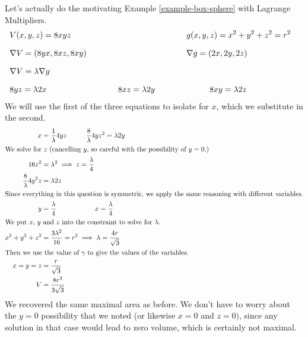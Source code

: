 \documentclass[fleqn,letterpaper]{report}
\begin{document}
\begin{example}
Let's actually do the motivating Example \ref{example-box-sphere} with
Lagrange Multipliers. 
\begin{displaymath}
\begin{array}{*4{>{\displaystyle}l}}
V(x,y,z) = 8xyz & & 
\hspace{1cm} g(x,y,z) = x^2 + y^2 + z^2 = r^2 & \\[1em]
\nabla V = (8yx,8xz,8xy) & & 
\hspace{1cm} \nabla g = (2x, 2y, 2z) & \\[1em]
\nabla V = \lambda \nabla g & & & \\[1em]
8yz = \lambda 2x & 
\hspace{1cm} 8xz = \lambda 2y & 
\hspace{2cm} 8xy = \lambda 2z & 
\end{array}
\end{displaymath}
We will use the first of the three equations to isolate for
$x$, which we substitute in the second. 
\begin{align*}
x & = \frac{1}{\lambda} 4yz 
\hspace{1cm} \frac{8}{\lambda} 4yz^2 = \lambda 2y \\
\intertext{We solve for $z$ (cancelling $y$, so careful with
the possibility of $y=0$.)}
16z^2 & = \lambda^2 \implies z = \frac{\lambda}{4} \\
\frac{8}{\lambda} 4 y^2 z & = \lambda 2z \\
\intertext{Since everything in this question is symmetric, we
apply the same reasoning with different variables.}
y & = \frac{\lambda}{4} \hspace{2cm} 
x = \frac{\lambda}{4} \\
\intertext{We put $x$, $y$ and $z$ into the constraint to
solve for $\lambda$.}
x^2 + y^2 + z^2 & = \frac{3\lambda^2}{16} = r^2 \implies 
\lambda = \frac{4r}{\sqrt{3}} \\
\intertext{Then we use the value of $\gamma$ to give the
values of the variables.}
x = y = z & = \frac{r}{\sqrt{3}} \\
V & = \frac{8r^3}{3\sqrt{3}}
\end{align*}
We recovered the same maximal area as before. We don't have to
worry about the $y=0$ possibility that we noted (or likewise
$x=0$ and $z=0)$, since any solution in that case would lead
to zero volume, which is certainly not maximal. 
\end{example}
\end{document}
